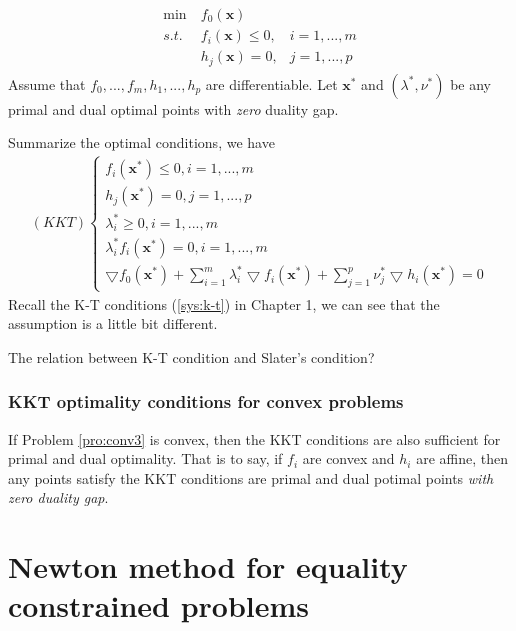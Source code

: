 \begin{align}
    \begin{array}{lll}
        \min \ &f_0 (\mathbf{x}) \\
        s.t. \ &f_i (\mathbf{x}) \leq 0, &i = 1,..., m \\
         &h_j (\mathbf{x}) = 0, &j = 1,..., p
    \end{array}
    \label{pro:conv3}
\end{align}
Assume that $f_0,..., f_m, h_1,...,h_p$ are
differentiable. Let $\mathbf{x}^*$ and
$(\lambda^*, \nu^*)$ be any primal and dual
optimal points with \emph{zero} duality gap.
\par
Summarize the optimal conditions, we have
\begin{align}
    (KKT)\left\{
    \begin{array}{lllll}
        f_i(\mathbf{x}^*) \leq 0, i = 1,...,m \\
        h_j(\mathbf{x}^*) = 0, j = 1,...,p \\
        \lambda_i^* \geq 0, i = 1,...,m \\
        \lambda_i^* f_i(\mathbf{x}^*) = 0, i = 1,...,m \\
        \bigtriangledown f_0(\mathbf{x}^*) +
        \sum_{i=1}^m \lambda_i^* \bigtriangledown f_i(\mathbf{x}^*) +
        \sum_{j=1}^p \nu_j^* \bigtriangledown h_i(\mathbf{x}^*)=0
    \end{array}    
    \right.
\end{align}
Recall the K-T conditions (\ref{sys:k-t}) in Chapter 1,
we can see that the assumption is a little bit different.
\par
{\color{red} The relation between K-T condition and
Slater's condition?}

\subsubsection{KKT optimality conditions for convex problems}
If Problem \ref{pro:conv3} is convex, then the KKT conditions
are also sufficient for primal and dual optimality. That is to say,
if $f_i$ are convex and $h_i$ are affine, then any points satisfy
the KKT conditions are primal and dual potimal points
\emph{with zero duality gap}.


\section{Newton method for equality constrained problems}
